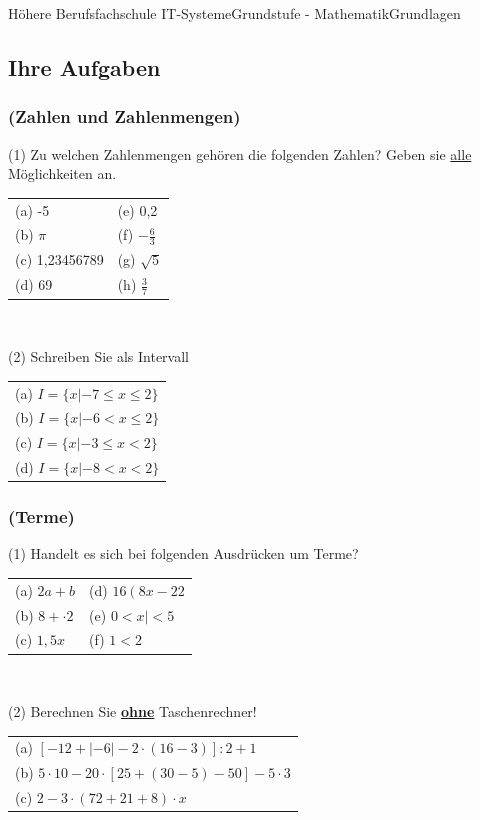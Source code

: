 \documentclass[11pt,twocolumn,oneside,openany,headings=optiontotoc,11pt,numbers=noenddot]{article}
\begin{document}
\begin{worksheet}{Höhere Berufsfachschule IT-Systeme}{Grundstufe - Mathematik}{Grundlagen}
		\subsection{Ihre Aufgaben}
		\subsubsection*{(Zahlen und Zahlenmengen)}
		(1) Zu welchen Zahlenmengen gehören die folgenden Zahlen? Geben sie \underline{alle} Möglichkeiten an.\\
		\begin{tabularx}{0.48\textwidth}{XX}
			(a) -5 & (e) 0,2\\
			(b) $\pi$ & (f) $-\frac{6}{3}$\\
			(c) 1,23456789 & (g) $\sqrt{5}$\\
			(d) 69 & (h) $\frac{3}{7}$
		\end{tabularx}\\
		\par\bigskip\noindent
		(2) Schreiben Sie als Intervall\\
		\begin{tabularx}{0.48\textwidth}{X}
			(a) \(I = \{x|-7\leq x\leq 2\}\)\\
			(b) \(I = \{x|-6< x\leq 2\}\)\\
			(c) \(I = \{x|-3\leq x< 2\}\)\\
			(d) \(I = \{x|-8< x< 2\}\)
		\end{tabularx}
		\subsubsection*{(Terme)}
		(1) Handelt es sich bei folgenden Ausdrücken um Terme?\\
		\begin{tabularx}{0.5\textwidth}{XX}
			(a) \(2a+b\) & (d) \(16\left(8x-22\right.\)\\
			(b) \(8 + \cdot{} 2\) & (e) \(0 < x| <5\)\\
			(c) \(1,5x\) & (f) \(1<2\)
		\end{tabularx}\\
		\par\bigskip\noindent
		(2) Berechnen Sie \underline{\textbf{ohne}} Taschenrechner!\\
		\begin{tabularx}{0.5\textwidth}{X}
			(a) \(\left[-12 + |-6| -2\cdot{}(16-3)\right]:2 + 1\)\\
			(b) \(5\cdot{}10 -20\cdot\left[25+(30-5)-50\right]-5\cdot{}3\)\\
			(c) \(2-3\cdot{}(72+21+8)\cdot{}x\)
		\end{tabularx}

\end{worksheet}
\end{document}
